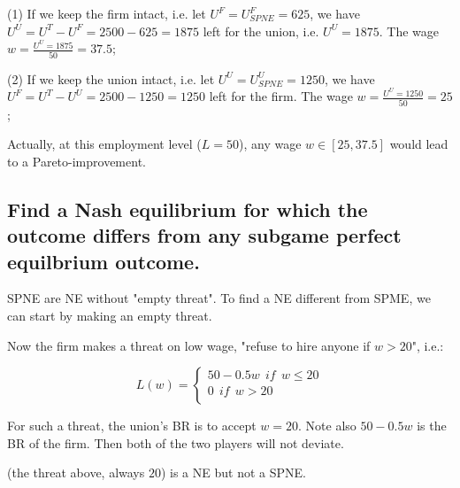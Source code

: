 \documentclass{article}
\begin{document}
\medskip

(1) If we keep the firm intact, i.e. let $U^F = U^F_{SPNE} = 625$,
we have $U^U=U^T-U^F = 2500-625 = 1875$ left for the union, i.e. $U^U = 1875$.
The wage $w= \frac{U^U = 1875}{50}=37.5$;

\medskip

(2) If we keep the union intact, i.e. let $U^U = U^U_{SPNE} = 1250$,
we have $U^F =U^T-U^U = 2500-1250 = 1250$ left for the firm.
The wage $w= \frac{U^U = 1250}{50}=25$;

\medskip

Actually, at this employment level ($L=50$), any wage $w \in [25,37.5]$ would lead to a Pareto-improvement. 
%
\subsection{Find a Nash equilibrium for which the outcome differs from any subgame perfect
equilbrium outcome.}

\begin{mdframed}[backgroundcolor=blue!20,linecolor=white]
SPNE are NE without "empty threat". To find a NE different from SPME, we can start by making an empty threat.

\end{mdframed}

Now the firm makes a threat on low wage, "refuse to hire anyone if $w > 20$", i.e.:

\begin{equation}
L(w)=
    \begin{cases}
    50-0.5w \ \ if \ \ w \le 20 \\
    0 \ \ if \ \ w > 20 \\
    \end{cases}
    \label{eq:threat}   
\end{equation}

For such a threat, the union's BR is to accept $w=20$. 
Note also $50-0.5w$ is the BR of the firm. Then both of the two players will not deviate.

(the threat above, always $20$) is a NE but not a SPNE.
\end{document}
